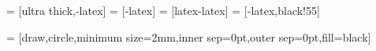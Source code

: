 
\usepackage{etex}
\usepackage{tikz}
\usepackage{pgfplots}
\pgfplotsset{compat=1.8}
\usetikzlibrary{arrows,decorations.markings}
\usetikzlibrary{calc}

   = [ultra thick,-latex]
 = [-latex]
    = [latex-latex]
   = [-latex,black!55]

 = [draw,circle,minimum size=2mm,inner sep=0pt,outer sep=0pt,fill=black]

